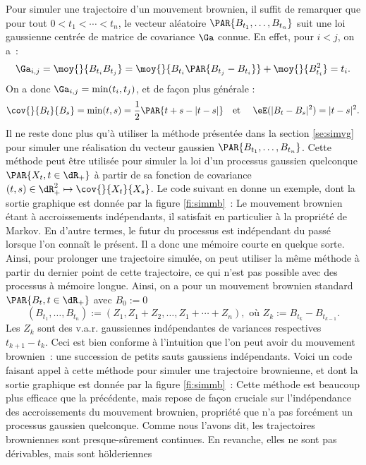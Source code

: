 Pour simuler une trajectoire d'un mouvement brownien, il suffit de remarquer
que pour tout $0<t_1<\cdots<t_n$, le vecteur aléatoire
$\PAR{B_{t_1},\ldots,B_{t_n}}$ suit une loi gaussienne centrée de matrice de
covariance $\Ga$ connue. En effet, pour $i<j$, on a~:
$$
\Ga_{i,j}
=\moy{}{B_{t_i}B_{t_j}}
=\moy{}{B_{t_i}\PAR{B_{t_j}-B_{t_i}}}+\moy{}{B_{t_i}^2}=t_i.
$$
On a donc $\Ga_{i,j}=\min(t_i,t_j)$, et de façon plus générale :
$$
\cov{}{B_t}{B_s}=\min(t,s)=\frac{1}{2}\PAR{t+s-|t-s|}
\text{\quad et \quad} 
\eE(|B_t-B_s|^2)=|t-s|^2.
$$
Il ne reste donc plus qu'à utiliser la méthode présentée dans la section
\ref{se:simvg} pour simuler une réalisation du vecteur gaussien
$\PAR{B_{t_1},\ldots,B_{t_n}}$.  Cette méthode peut être utilisée pour simuler
la loi d'un processus gaussien quelconque $\PAR{X_t,t\in\dR_+}$ à partir de sa
fonction de covariance $(t,s)\in\dR_+^2\mapsto\cov{}{X_t}{X_s}$. Le code \ML{}
suivant en donne un exemple, dont la sortie graphique est donnée par la figure
\ref{fi:simmb}~:
%
%
%
Le mouvement brownien étant à accroissements indépendants, il satisfait en
particulier à la propriété de Markov. En d'autre termes, le futur du processus
est indépendant du passé lorsque l'on connaît le présent. Il a donc une
mémoire courte en quelque sorte. Ainsi, pour prolonger une trajectoire
simulée, on peut utiliser la même méthode à partir du dernier point de cette
trajectoire, ce qui n'est pas possible avec des processus à mémoire longue.
Ainsi, on a pour un mouvement brownien standard $\PAR{B_t,t\in\dR_+}$ avec
$B_0:=0$
$$
(B_{t_1},\ldots,B_{t_n}):=(Z_1,Z_1+Z_2,\ldots,Z_1+\cdots+Z_n), \text{ où }
Z_k:=B_{t_k}-B_{t_{k-1}}.
$$
Les $Z_k$ sont des v.a.r. gaussiennes indépendantes de variances
respectives $t_{k+1}-t_k$.  Ceci est bien conforme à l'intuition que l'on peut
avoir du mouvement brownien~: une succession de petits sauts gaussiens
indépendants. Voici un code \ML{} faisant appel à cette méthode pour simuler
une trajectoire brownienne, et dont la sortie graphique est donnée par la
figure \ref{fi:simmb}~:
%
%
Cette méthode est beaucoup plus efficace que la précédente, mais repose de
façon cruciale sur l'indépendance des accroissements du mouvement brownien,
propriété que n'a pas forcément un processus gaussien quelconque.
%
%  
Comme nous l'avons dit, les trajectoires browniennes sont presque-sûrement
continues. En revanche, elles ne sont pas dérivables, mais sont hölderiennes

